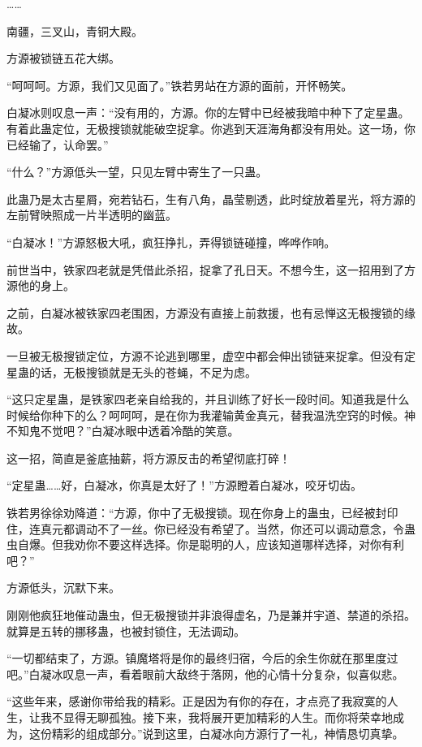 \begin{this_body}
……

南疆，三叉山，青铜大殿。

方源被锁链五花大绑。

“呵呵呵。方源，我们又见面了。”铁若男站在方源的面前，开怀畅笑。

白凝冰则叹息一声：“没有用的，方源。你的左臂中已经被我暗中种下了定星蛊。有着此蛊定位，无极搜锁就能破空捉拿。你逃到天涯海角都没有用处。这一场，你已经输了，认命罢。”

“什么？”方源低头一望，只见左臂中寄生了一只蛊。

此蛊乃是太古星屑，宛若钻石，生有八角，晶莹剔透，此时绽放着星光，将方源的左前臂映照成一片半透明的幽蓝。

“白凝冰！”方源怒极大吼，疯狂挣扎，弄得锁链碰撞，哗哗作响。

前世当中，铁家四老就是凭借此杀招，捉拿了孔日天。不想今生，这一招用到了方源他的身上。

之前，白凝冰被铁家四老围困，方源没有直接上前救援，也有忌惮这无极搜锁的缘故。

一旦被无极搜锁定位，方源不论逃到哪里，虚空中都会伸出锁链来捉拿。但没有定星蛊的话，无极搜锁就是无头的苍蝇，不足为虑。

“这只定星蛊，是铁家四老亲自给我的，并且训练了好长一段时间。知道我是什么时候给你种下的么？呵呵呵，是在你为我灌输黄金真元，替我温洗空窍的时候。神不知鬼不觉吧？”白凝冰眼中透着冷酷的笑意。

这一招，简直是釜底抽薪，将方源反击的希望彻底打碎！

“定星蛊……好，白凝冰，你真是太好了！”方源瞪着白凝冰，咬牙切齿。

铁若男徐徐劝降道：“方源，你中了无极搜锁。现在你身上的蛊虫，已经被封印住，连真元都调动不了一丝。你已经没有希望了。当然，你还可以调动意念，令蛊虫自爆。但我劝你不要这样选择。你是聪明的人，应该知道哪样选择，对你有利吧？”

方源低头，沉默下来。

刚刚他疯狂地催动蛊虫，但无极搜锁并非浪得虚名，乃是兼并宇道、禁道的杀招。就算是五转的挪移蛊，也被封锁住，无法调动。

“一切都结束了，方源。镇魔塔将是你的最终归宿，今后的余生你就在那里度过吧。”白凝冰叹息一声，看着眼前大敌终于落网，他的心情十分复杂，似喜似悲。

“这些年来，感谢你带给我的精彩。正是因为有你的存在，才点亮了我寂寞的人生，让我不显得无聊孤独。接下来，我将展开更加精彩的人生。而你将荣幸地成为，这份精彩的组成部分。”说到这里，白凝冰向方源行了一礼，神情恳切真挚。

\end{this_body}


